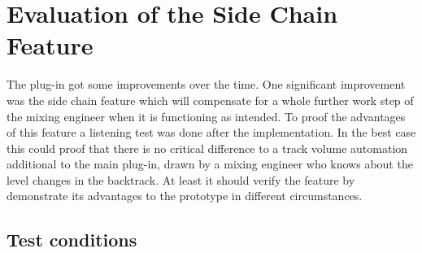 \chapter{Evaluation of the Side Chain Feature}
\label{chapter:evaluation}

The plug-in got some improvements over the time. One significant improvement was the side chain feature which will compensate for a whole further work step of the mixing engineer when it is functioning as intended. To proof the advantages of this feature a listening test was done after the implementation. In the best case this could proof that there is no critical difference to a track volume automation additional to the main plug-in, drawn by a mixing engineer who knows about the level changes in the backtrack. At least it should verify the feature by demonstrate its advantages to the prototype in different circumstances.\\

\section{Test conditions}

